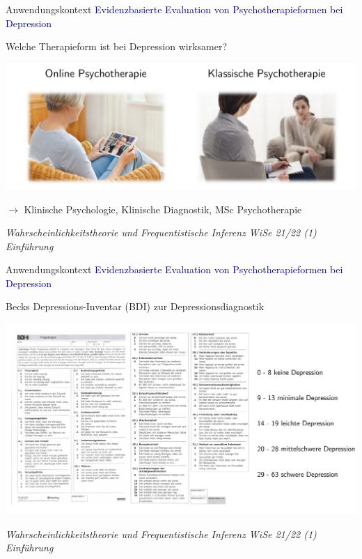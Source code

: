 \documentclass[
  8pt,
  ignorenonframetext,
]{beamer}
\begin{document}
\begin{frame}{Anwendungskontext}
\protect\hypertarget{anwendungskontext}{}
\textcolor{darkblue}{Evidenzbasierte Evaluation von Psychotherapieformen bei Depression}

\normalsize

Welche Therapieform ist bei Depression wirksamer?

\begin{center}\includegraphics[width=1.1\linewidth]{8_Abbildungen/alm_8_klinische_forschung} \end{center}

\(\rightarrow\) Klinische Psychologie, Klinische Diagnostik, MSc
Psychotherapie

\footnotesize
\flushright

\emph{Wahrscheinlichkeitstheorie und Frequentistische Inferenz WiSe
21/22 (1) Einführung}
\end{frame}

\begin{frame}{Anwendungskontext}
\protect\hypertarget{anwendungskontext-1}{}
\textcolor{darkblue}{Evidenzbasierte Evaluation von Psychotherapieformen bei Depression}

\normalsize

Becks Depressions-Inventar (BDI) zur Depressionsdiagnostik

\begin{center}\includegraphics[width=0.95\linewidth]{8_Abbildungen/alm_8_bdi} \end{center}
\footnotesize
\flushright

\emph{Wahrscheinlichkeitstheorie und Frequentistische Inferenz WiSe
21/22 (1) Einführung}
\end{frame}
\end{document}
